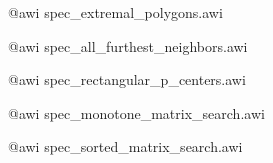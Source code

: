 
\ccParDims
\cgalColumnLayout


@awi spec_extremal_polygons.awi

@awi spec_all_furthest_neighbors.awi

@awi spec_rectangular_p_centers.awi

@awi spec_monotone_matrix_search.awi

@awi spec_sorted_matrix_search.awi

